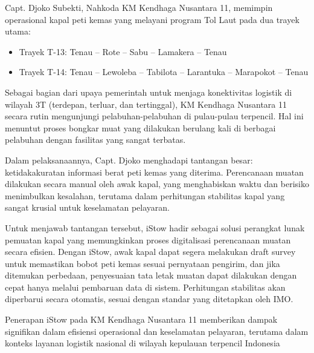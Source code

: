 Capt. Djoko Subekti, Nahkoda KM Kendhaga Nusantara 11, memimpin operasional kapal peti kemas yang melayani program Tol Laut pada dua trayek utama:
\begin{itemize}
    \item Trayek T-13: Tenau – Rote – Sabu – Lamakera – Tenau
    \item Trayek T-14: Tenau – Lewoleba – Tabilota – Larantuka – Marapokot – Tenau
\end{itemize}

Sebagai bagian dari upaya pemerintah untuk menjaga konektivitas logistik di wilayah 3T (terdepan, terluar, dan tertinggal), KM Kendhaga Nusantara 11 secara rutin mengunjungi pelabuhan-pelabuhan di pulau-pulau terpencil. Hal ini menuntut proses bongkar muat yang dilakukan berulang kali di berbagai pelabuhan dengan fasilitas yang sangat terbatas.

Dalam pelaksanaannya, Capt. Djoko menghadapi tantangan besar: ketidakakuratan informasi berat peti kemas yang diterima. Perencanaan muatan dilakukan secara manual oleh awak kapal, yang menghabiskan waktu dan berisiko menimbulkan kesalahan, terutama dalam perhitungan stabilitas kapal yang sangat krusial untuk keselamatan pelayaran.

Untuk menjawab tantangan tersebut, iStow hadir sebagai solusi perangkat lunak pemuatan kapal yang memungkinkan proses digitalisasi perencanaan muatan secara efisien. Dengan iStow, awak kapal dapat segera melakukan draft survey untuk memastikan bobot peti kemas sesuai pernyataan pengirim, dan jika ditemukan perbedaan, penyesuaian tata letak muatan dapat dilakukan dengan cepat hanya melalui pembaruan data di sistem. Perhitungan stabilitas akan diperbarui secara otomatis, sesuai dengan standar yang ditetapkan oleh IMO.

Penerapan iStow pada KM Kendhaga Nusantara 11 memberikan dampak signifikan dalam efisiensi operasional dan keselamatan pelayaran, terutama dalam konteks layanan logistik nasional di wilayah kepulauan terpencil Indonesia

